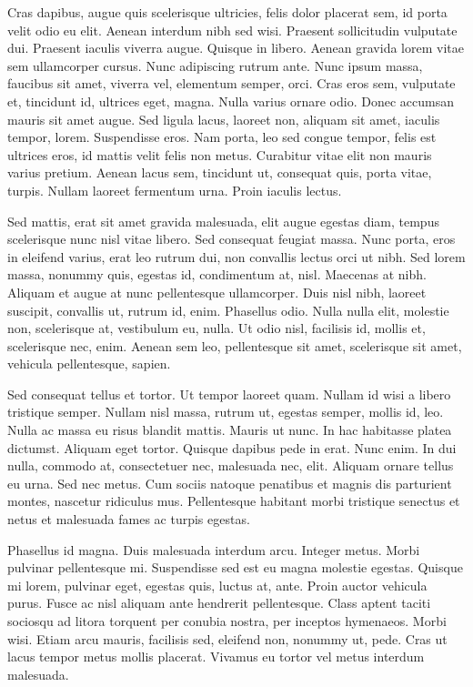 \documentclass{article}
\begin{document}
Cras dapibus, augue quis scelerisque ultricies, felis dolor placerat sem, id
porta velit odio eu elit. Aenean interdum nibh sed wisi. Praesent sollicitudin
vulputate dui. Praesent iaculis viverra augue. Quisque in libero. Aenean
gravida lorem vitae sem ullamcorper cursus. Nunc adipiscing rutrum ante. Nunc
ipsum massa, faucibus sit amet, viverra vel, elementum semper, orci. Cras eros
sem, vulputate et, tincidunt id, ultrices eget, magna. Nulla varius ornare
odio. Donec accumsan mauris sit amet augue. Sed ligula lacus, laoreet non,
aliquam sit amet, iaculis tempor, lorem. Suspendisse eros. Nam porta, leo sed
congue tempor, felis est ultrices eros, id mattis velit felis non metus.
Curabitur vitae elit non mauris varius pretium. Aenean lacus sem, tincidunt ut,
consequat quis, porta vitae, turpis. Nullam laoreet fermentum urna. Proin
iaculis lectus.

Sed mattis, erat sit amet gravida malesuada, elit augue egestas diam, tempus
scelerisque nunc nisl vitae libero. Sed consequat feugiat massa. Nunc porta,
eros in eleifend varius, erat leo rutrum dui, non convallis lectus orci ut
nibh. Sed lorem massa, nonummy quis, egestas id, condimentum at, nisl. Maecenas
at nibh. Aliquam et augue at nunc pellentesque ullamcorper. Duis nisl nibh,
laoreet suscipit, convallis ut, rutrum id, enim. Phasellus odio. Nulla nulla
elit, molestie non, scelerisque at, vestibulum eu, nulla. Ut odio nisl,
facilisis id, mollis et, scelerisque nec, enim. Aenean sem leo, pellentesque
sit amet, scelerisque sit amet, vehicula pellentesque, sapien.

Sed consequat tellus et tortor. Ut tempor laoreet quam. Nullam id wisi a
libero tristique semper. Nullam nisl massa, rutrum ut, egestas semper, mollis
id, leo. Nulla ac massa eu risus blandit mattis. Mauris ut nunc. In hac
habitasse platea dictumst. Aliquam eget tortor. Quisque dapibus pede in erat.
Nunc enim. In dui nulla, commodo at, consectetuer nec, malesuada nec, elit.
Aliquam ornare tellus eu urna. Sed nec metus. Cum sociis natoque penatibus et
magnis dis
parturient montes, nascetur ridiculus mus. Pellentesque habitant morbi tristique
senectus et netus et malesuada fames ac turpis egestas.

Phasellus id magna. Duis malesuada interdum arcu. Integer metus. Morbi
pulvinar pellentesque mi. Suspendisse sed est eu magna molestie egestas.
Quisque mi lorem, pulvinar eget, egestas quis, luctus at, ante. Proin auctor
vehicula purus. Fusce ac nisl aliquam ante hendrerit pellentesque. Class aptent
taciti sociosqu ad litora torquent per conubia nostra, per inceptos hymenaeos.
Morbi wisi. Etiam arcu mauris, facilisis sed, eleifend non, nonummy ut, pede.
Cras ut lacus tempor metus mollis placerat. Vivamus eu tortor vel metus
interdum malesuada.
\end{document}
